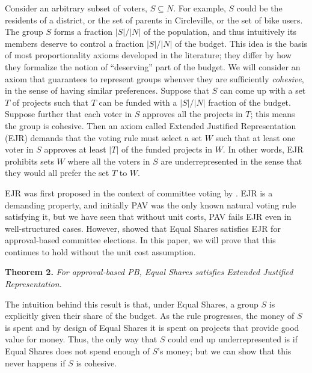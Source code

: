 \documentclass[10pt]{scrartcl}
\theoremstyle{definition}
\theoremstyle{plain}
\newtheorem{theorem}{Theorem}
\begin{document}
Consider an arbitrary subset of voters, $S \subseteq N$. For example, $S$ could be the residents of a district, or the set of parents in Circleville, or the set of bike users. The group $S$ forms a fraction $|S|/|N|$ of the population, and thus intuitively its members deserve to control a fraction $|S|/|N|$ of the budget. This idea is the basis of most proportionality axioms developed in the literature; they differ by how they formalize the notion of ``deserving'' part of the budget. We will consider an axiom that guarantees to represent groups whenver they are sufficiently \emph{cohesive}, in the sense of having similar preferences. Suppose that $S$ can come up with a set $T$ of projects such that $T$ can be funded with a $|S|/|N|$ fraction of the budget. Suppose further that each voter in $S$ approves all the projects in $T$; this means the group is cohesive. Then an axiom called Extended Justified Representation (EJR) demands that the voting rule must select a set $W$ such that at least one voter in $S$ approves at least $|T|$ of the funded projects in $W$. In other words, EJR prohibits sets $W$ where all the voters in $S$ are underrepresented in the sense that they would all prefer the set $T$ to $W$.

EJR was first proposed in the context of committee voting by \citet{justifiedRepresentation}. EJR is a demanding property, and initially PAV was the only known natural voting rule satisfying it, but we have seen that without unit costs, PAV fails EJR even in well-structured cases. 
However, \citet{pet-sko:laminar} showed that Equal Shares satisfies EJR for approval-based committee elections. In this paper, we will prove that this continues to hold without the unit cost assumption.

\medskip
\noindent
\textbf{Theorem 2.} \emph{For approval-based PB, Equal Shares satisfies Extended Justified Representation.}
\medskip

The intuition behind this result is that, under Equal Shares, a group $S$ is explicitly given their share of the budget. As the rule progresses, the money of $S$ is spent and by design of Equal Shares it is spent on projects that provide good value for money. Thus, the only way that $S$ could end up underrepresented is if Equal Shares does not spend enough of $S$'s money; but we can show that this never happens if $S$ is cohesive.
\end{document}
